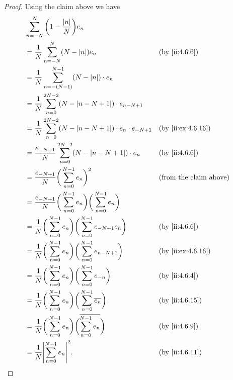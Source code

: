 \begin{proof}
  Using the claim above we have
  \begin{align*}
     & \sum_{n = -N}^N \bigg(1 - \dfrac{\abs{n}}{N}\bigg) e_n                                                                                 \\
     & = \dfrac{1}{N} \sum_{n = -N}^N (N - \abs{n}) e_n                                                    &  & \by{ii:4.6.6}                 \\
     & = \dfrac{1}{N} \sum_{n = -(N - 1)}^{N - 1} (N - \abs{n}) \cdot e_n                                                                     \\
     & = \dfrac{1}{N} \sum_{n = 0}^{2N - 2} (N - \abs{n - N + 1}) \cdot e_{n - N + 1}                                                         \\
     & = \dfrac{1}{N} \sum_{n = 0}^{2N - 2} (N - \abs{n - N + 1}) \cdot e_n \cdot e_{-N + 1}               &  & \by{ii:ex:4.6.16}             \\
     & = \dfrac{e_{-N + 1}}{N} \sum_{n = 0}^{2N - 2} (N - \abs{n - N + 1}) \cdot e_n                       &  & \by{ii:4.6.6}                 \\
     & = \dfrac{e_{-N + 1}}{N} \bigg(\sum_{n = 0}^{N - 1} e_n\bigg)^2                                      &  & \text{(from the claim above)} \\
     & = \dfrac{e_{-N + 1}}{N} \bigg(\sum_{n = 0}^{N - 1} e_n\bigg) \bigg(\sum_{n = 0}^{N - 1} e_n\bigg)                                      \\
     & = \dfrac{1}{N} \bigg(\sum_{n = 0}^{N - 1} e_n\bigg) \bigg(\sum_{n = 0}^{N - 1} e_{-N + 1} e_n\bigg) &  & \by{ii:4.6.6}                 \\
     & = \dfrac{1}{N} \bigg(\sum_{n = 0}^{N - 1} e_n\bigg) \bigg(\sum_{n = 0}^{N - 1} e_{n - N + 1}\bigg)  &  & \by{ii:ex:4.6.16}             \\
     & = \dfrac{1}{N} \bigg(\sum_{n = 0}^{N - 1} e_n\bigg) \bigg(\sum_{n = 0}^{N - 1} e_{-n}\bigg)         &  & \by{ii:4.6.4}                 \\
     & = \dfrac{1}{N} \bigg(\sum_{n = 0}^{N - 1} e_n\bigg) \bigg(\sum_{n = 0}^{N - 1} \overline{e_n}\bigg) &  & \by{ii:4.6.15}                \\
     & = \dfrac{1}{N} \bigg(\sum_{n = 0}^{N - 1} e_n\bigg) \bigg(\overline{\sum_{n = 0}^{N - 1} e_n}\bigg) &  & \by{ii:4.6.9}                 \\
     & = \dfrac{1}{N} \abs{\sum_{n = 0}^{N - 1} e_n}^2.                                                    &  & \by{ii:4.6.11}
  \end{align*}
\end{proof}

